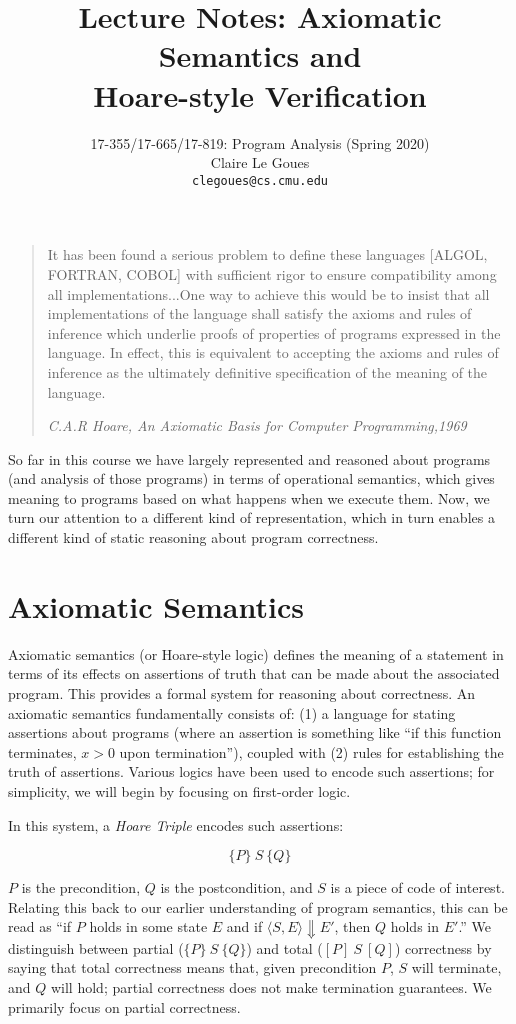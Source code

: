 \documentclass[11pt]{article}
\title{Lecture Notes: Axiomatic Semantics and \\ Hoare-style Verification}
\author{17-355/17-665/17-819: Program Analysis (Spring 2020)\\
        Claire Le Goues \\
		{\tt clegoues@cs.cmu.edu}}
\date{}
\begin{document}
\maketitle


\begin{quote}
  It has been found a serious problem to define these languages [ALGOL, FORTRAN,
  COBOL] with sufficient rigor to ensure compatibility among all
  implementations...One way to achieve this would be to insist that all
  implementations of the language shall satisfy the axioms and rules of
  inference which underlie proofs of properties of programs expressed in the
  language. In effect, this is equivalent to accepting the axioms and rules of
  inference as the ultimately definitive specification of the meaning of the
  language.

\emph{C.A.R Hoare, An Axiomatic Basis for Computer Programming,1969}
\end{quote}


So far in this course we have largely represented and reasoned about programs
(and analysis of those programs) in terms of operational semantics, which gives
meaning to programs based on what happens when we execute them.  Now, we turn
our attention to a different kind of representation, which in turn enables a
different kind of static reasoning about program correctness. 

\section{Axiomatic Semantics}

Axiomatic semantics (or Hoare-style logic) defines the meaning of a
statement in terms of its effects on assertions of truth that can be made about
the associated program. This provides a formal system for reasoning about correctness.
An axiomatic semantics fundamentally consists of: (1) a language for stating
assertions about programs (where an assertion is something like ``if this
function terminates, $x > 0$ upon termination''), coupled with (2) rules for
establishing the truth of assertions.  Various logics have been used to encode
such assertions; for simplicity, we will begin by focusing on first-order logic.

In this system, a \emph{Hoare Triple} encodes such assertions:

\[
\{P\} ~S~ \{Q\}
\]

$P$ is the precondition, $Q$ is the postcondition, and $S$ is a
piece of code of interest.  Relating this back to our earlier understanding of
program semantics, this can be read as ``if $P$ holds in some state $E$ and if
$\langle S, E \rangle \Downarrow E'$, then $Q$ holds in $E'$.''  We distinguish
between partial ($\{P\}~S~\{Q\}$) and total ($[P]~S~[Q]$) correctness by saying that total
correctness means that, given precondition $P$, $S$ will terminate, and $Q$
will hold; partial correctness does not make termination guarantees.  We primarily
focus on partial correctness.
\end{document}
